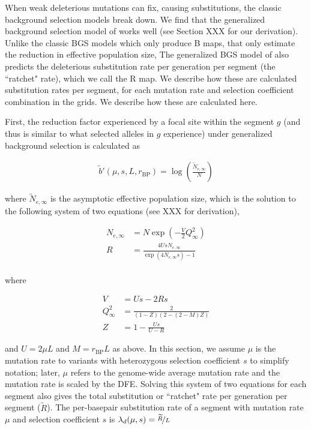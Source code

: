 \documentclass[11pt]{article}
\begin{document}
When weak deleterious mutations can fix, causing substitutions, the classic
background selection models break down. We find that the generalized background
selection model of \textcite{Santiago2016-mu} works well (see Section XXX for
our derivation). Unlike the classic BGS models which only produce B maps, that
only estimate the reduction in effective population size, The generalized BGS
model of \textcite{Santiago2016-mu} also predicts the deleterious substitution
rate per generation per segment (the ``ratchet" rate), which we call the R map.
We describe how these are calculated substitution rates per segment, for each
mutation rate and selection coefficient combination in the grids. We describe
how these are calculated here.

First, the reduction factor experienced by a focal site within the segment $g$
(and thus is similar to what selected alleles in $g$ experience) under
generalized background selection is calculated as

\begin{align}
  \widetilde{b}'(\mu, s, L, r_\text{BP}) = \log\left(\frac{\widetilde{N}_{e,\infty}}{N} \right)
\end{align}

where $\widetilde{N}_{e,\infty}$ is the asymptotic effective population size,
which is the solution to the following system of two equations (see XXX for
derivation),

\begin{align}
    {N}_{e,\infty} &= N \exp \left( -\frac{V}{2} Q_\infty^2 \right) \label{eqn:Ne_VQ2} \\
  {R} &= \frac{4 U s N_{e,\infty}}{\exp(4 N_{e,\infty} s)-1} \nonumber \\
\end{align}

where 

\begin{align}
  V &= U s - 2 {R} s \\
  Q_\infty^2 &= \frac{2}{(1-Z)(2-(2-M)Z)} \\
  Z &= 1 - \frac{Us}{U-{R}}
\end{align}

and $U = 2\mu L$ and $M = r_\text{BP} L$ as above. In this section, we assume
$\mu$ is the mutation rate to variants with heterozygous selection coefficient
$s$ to simplify notation; later, $\mu$ refers to the genome-wide average
mutation rate and the mutation rate is scaled by the DFE. Solving this system
of two equations for each segment also gives the total substitution or
``ratchet" rate per generation per segment ($\widetilde{R}$). The per-basepair
substitution rate of a segment with mutation rate $\mu$ and selection
coefficient $s$ is $\lambda_d(\mu, s) = \nicefrac{\widetilde{R}}{L}$
\end{document}
